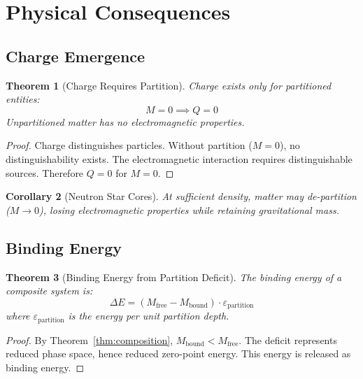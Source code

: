 \documentclass[twocolumn,amsmath,amssymb,aps,prl,superscriptaddress]{revtex4-2}
\newtheorem{theorem}{Theorem}[section]
\newtheorem{corollary}[theorem]{Corollary}
\newcommand{\Mpart}{M}
\begin{document}
\section{Physical Consequences}
\label{sec:consequences}

\subsection{Charge Emergence}

\begin{theorem}[Charge Requires Partition]
\label{thm:charge}
Charge exists only for partitioned entities:
\begin{equation}
\boxed{\Mpart = 0 \implies Q = 0}
\end{equation}
Unpartitioned matter has no electromagnetic properties.
\end{theorem}

\begin{proof}
Charge distinguishes particles. Without partition ($\Mpart = 0$), no distinguishability exists. The electromagnetic interaction requires distinguishable sources. Therefore $Q = 0$ for $\Mpart = 0$.
\end{proof}

\begin{corollary}[Neutron Star Cores]
At sufficient density, matter may de-partition ($\Mpart \to 0$), losing electromagnetic properties while retaining gravitational mass.
\end{corollary}

\subsection{Binding Energy}

\begin{theorem}[Binding Energy from Partition Deficit]
\label{thm:binding}
The binding energy of a composite system is:
\begin{equation}
\boxed{\Delta E = (\Mpart_{\text{free}} - \Mpart_{\text{bound}}) \cdot \varepsilon_{\text{partition}}}
\end{equation}
where $\varepsilon_{\text{partition}}$ is the energy per unit partition depth.
\end{theorem}

\begin{proof}
By Theorem~\ref{thm:composition}, $\Mpart_{\text{bound}} < \Mpart_{\text{free}}$. The deficit represents reduced phase space, hence reduced zero-point energy. This energy is released as binding energy.
\end{proof}
\end{document}
